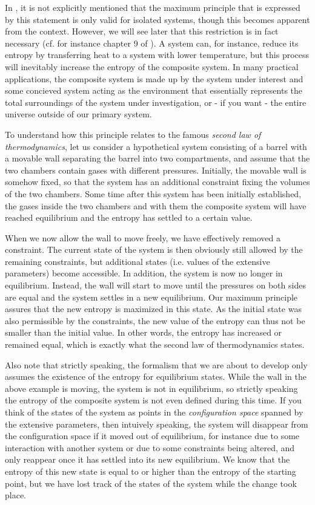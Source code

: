 \documentclass[a4paper, draft]{article}
\theoremstyle{own}
\theoremstyle{remark}
\begin{document}
In \cite{Callen}, it is not explicitly mentioned that the maximum principle that is expressed by this statement is only valid for isolated systems, though this becomes apparent from the context. However, we will see later that this restriction is in fact necessary (cf. for instance chapter 9 of \cite{Sweden}). A system can, for instance, reduce its entropy by transferring heat to a system with lower temperature, but this process will inevitably increase the entropy of the composite system. In many practical applications, the composite system is made up by the system under interest and some concieved system acting as the environment that essentially represents the total surroundings of the system under investigation, or - if you want - the entire universe outside of our primary system.

To understand how this principle relates to the famous {\em second law of thermodynamics}, let us consider a hypothetical system consisting of a barrel with a movable wall separating the barrel into two compartments, and assume that the two chambers contain gases with different pressures. Initially, the movable wall is somehow fixed, so that the system has an additional constraint fixing the volumes of the two chambers. Some time after this system has been initially established, the gases inside the two chambers and with them the composite system will have reached equilibrium and the entropy has settled to a certain value. 

When we now allow the wall to move freely, we have effectively removed a constraint. The current state of the system is then obviously still allowed by the remaining constraints, but additional states (i.e. values of the extensive parameters) become accessible. In addition, the system is now no longer in equilibrium. Instead, the wall will start to move until the pressures on both sides are equal and the system settles in a new equilibrium. Our maximum principle assures that the new entropy is maximized in this state. As the initial state was also permissible by the constraints, the new value of the entropy can thus not be smaller than the initial value. In other words, the entropy has increased or remained equal, which is exactly what the second law of thermodynamics states. 

Also note that strictly speaking, the formalism that we are about to develop only assumes the existence of the entropy for equilibrium states. While the wall in the above example is moving, the system is not in equilibrium, so strictly speaking the entropy of the composite system is not even defined during this time. If you think of the states of the system as points in the {\em configuration space} spanned by the extensive parameters, then intuively speaking, the system will disappear from the configuration space if it moved out of equilibrium, for instance due to some interaction with another system or due to some constraints being altered, and only reappear once it has settled into its new equilibrium. We know that the entropy of this new state is equal to or higher than the entropy of the starting point, but we have lost track of the states of the system while the change took place.
\end{document}
